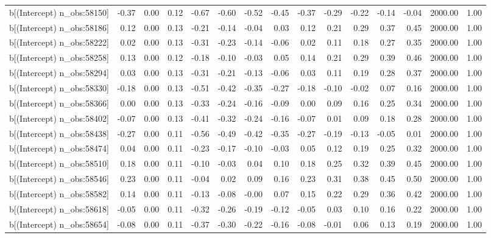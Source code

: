 \begin{table}[ht]
\begin{tabular}{rrrrrrrrrrrrrrr}
  b[(Intercept) n\_obs:58150] & -0.37 & 0.00 & 0.12 & -0.67 & -0.60 & -0.52 & -0.45 & -0.37 & -0.29 & -0.22 & -0.14 & -0.04 & 2000.00 & 1.00 \\ 
  b[(Intercept) n\_obs:58186] & 0.12 & 0.00 & 0.13 & -0.21 & -0.14 & -0.04 & 0.03 & 0.12 & 0.21 & 0.29 & 0.37 & 0.45 & 2000.00 & 1.00 \\ 
  b[(Intercept) n\_obs:58222] & 0.02 & 0.00 & 0.13 & -0.31 & -0.23 & -0.14 & -0.06 & 0.02 & 0.11 & 0.18 & 0.27 & 0.35 & 2000.00 & 1.00 \\ 
  b[(Intercept) n\_obs:58258] & 0.13 & 0.00 & 0.12 & -0.18 & -0.10 & -0.03 & 0.05 & 0.14 & 0.21 & 0.29 & 0.39 & 0.46 & 2000.00 & 1.00 \\ 
  b[(Intercept) n\_obs:58294] & 0.03 & 0.00 & 0.13 & -0.31 & -0.21 & -0.13 & -0.06 & 0.03 & 0.11 & 0.19 & 0.28 & 0.37 & 2000.00 & 1.00 \\ 
  b[(Intercept) n\_obs:58330] & -0.18 & 0.00 & 0.13 & -0.51 & -0.42 & -0.35 & -0.27 & -0.18 & -0.10 & -0.02 & 0.07 & 0.16 & 2000.00 & 1.00 \\ 
  b[(Intercept) n\_obs:58366] & 0.00 & 0.00 & 0.13 & -0.33 & -0.24 & -0.16 & -0.09 & 0.00 & 0.09 & 0.16 & 0.25 & 0.34 & 2000.00 & 1.00 \\ 
  b[(Intercept) n\_obs:58402] & -0.07 & 0.00 & 0.13 & -0.41 & -0.32 & -0.24 & -0.16 & -0.07 & 0.01 & 0.09 & 0.18 & 0.28 & 2000.00 & 1.00 \\ 
  b[(Intercept) n\_obs:58438] & -0.27 & 0.00 & 0.11 & -0.56 & -0.49 & -0.42 & -0.35 & -0.27 & -0.19 & -0.13 & -0.05 & 0.01 & 2000.00 & 1.00 \\ 
  b[(Intercept) n\_obs:58474] & 0.04 & 0.00 & 0.11 & -0.23 & -0.17 & -0.10 & -0.03 & 0.05 & 0.12 & 0.19 & 0.25 & 0.32 & 2000.00 & 1.00 \\ 
  b[(Intercept) n\_obs:58510] & 0.18 & 0.00 & 0.11 & -0.10 & -0.03 & 0.04 & 0.10 & 0.18 & 0.25 & 0.32 & 0.39 & 0.45 & 2000.00 & 1.00 \\ 
  b[(Intercept) n\_obs:58546] & 0.23 & 0.00 & 0.11 & -0.04 & 0.02 & 0.09 & 0.16 & 0.23 & 0.31 & 0.38 & 0.45 & 0.50 & 2000.00 & 1.00 \\ 
  b[(Intercept) n\_obs:58582] & 0.14 & 0.00 & 0.11 & -0.13 & -0.08 & -0.00 & 0.07 & 0.15 & 0.22 & 0.29 & 0.36 & 0.42 & 2000.00 & 1.00 \\ 
  b[(Intercept) n\_obs:58618] & -0.05 & 0.00 & 0.11 & -0.32 & -0.26 & -0.19 & -0.12 & -0.05 & 0.03 & 0.10 & 0.16 & 0.22 & 2000.00 & 1.00 \\ 
  b[(Intercept) n\_obs:58654] & -0.08 & 0.00 & 0.11 & -0.37 & -0.30 & -0.22 & -0.16 & -0.08 & -0.01 & 0.06 & 0.13 & 0.19 & 2000.00 & 1.00 \\ 

\end{tabular}
\end{table}
